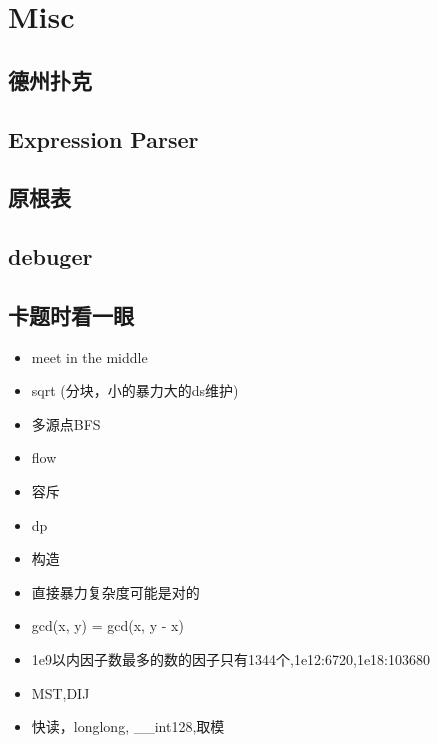 \section{Misc}

\subsection{德州扑克}


\subsection{Expression Parser}


\subsection{原根表}


\subsection{debuger}


\subsection{卡题时看一眼}
\begin{itemize}
    \item meet in the middle
    \item sqrt (分块，小的暴力大的ds维护)
    \item 多源点BFS
    \item flow
    \item 容斥
    \item dp
    \item 构造
    \item 直接暴力复杂度可能是对的
    \item gcd(x, y) = gcd(x, y - x)
    \item 1e9以内因子数最多的数的因子只有1344个,1e12:6720,1e18:103680
    \item MST,DIJ
    \item 快读，longlong, \_\_int128,取模
\end{itemize}